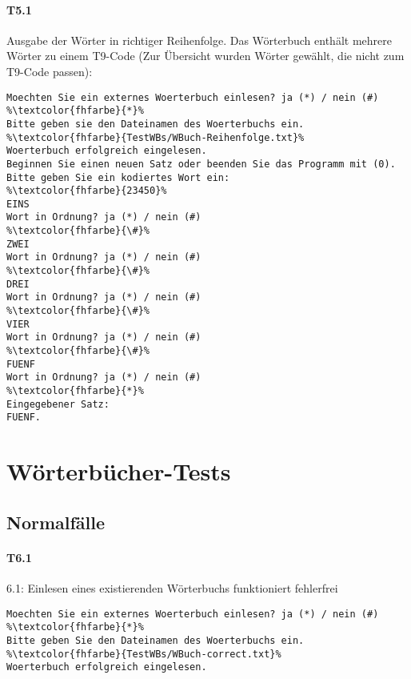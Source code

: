 \paragraph*{T5.1} Ausgabe der Wörter in richtiger Reihenfolge.
Das Wörterbuch enthält mehrere Wörter zu einem T9-Code (Zur Übersicht wurden Wörter gewählt, die nicht zum T9-Code passen):
\begin{center}
\end{center}
\begin{lstlisting}[escapechar=\%]
Moechten Sie ein externes Woerterbuch einlesen? ja (*) / nein (#)
%\textcolor{fhfarbe}{*}%
Bitte geben sie den Dateinamen des Woerterbuchs ein.
%\textcolor{fhfarbe}{TestWBs/WBuch-Reihenfolge.txt}%
Woerterbuch erfolgreich eingelesen.
Beginnen Sie einen neuen Satz oder beenden Sie das Programm mit (0).
Bitte geben Sie ein kodiertes Wort ein:
%\textcolor{fhfarbe}{23450}%
EINS
Wort in Ordnung? ja (*) / nein (#)
%\textcolor{fhfarbe}{\#}%
ZWEI
Wort in Ordnung? ja (*) / nein (#)
%\textcolor{fhfarbe}{\#}%
DREI
Wort in Ordnung? ja (*) / nein (#)
%\textcolor{fhfarbe}{\#}%
VIER
Wort in Ordnung? ja (*) / nein (#)
%\textcolor{fhfarbe}{\#}%
FUENF
Wort in Ordnung? ja (*) / nein (#)
%\textcolor{fhfarbe}{*}%
Eingegebener Satz:
FUENF.
\end{lstlisting}


\section{Wörterbücher-Tests}\label{sec:wörterbücher-tests}

\subsection*{Normalfälle}\label{subsec:wbuch-normalfaelle}
\paragraph*{T6.1} 6.1: Einlesen eines existierenden Wörterbuchs funktioniert fehlerfrei
\begin{lstlisting}[escapechar=\%]
Moechten Sie ein externes Woerterbuch einlesen? ja (*) / nein (#)
%\textcolor{fhfarbe}{*}%
Bitte geben Sie den Dateinamen des Woerterbuchs ein.
%\textcolor{fhfarbe}{TestWBs/WBuch-correct.txt}%
Woerterbuch erfolgreich eingelesen.
\end{lstlisting}

